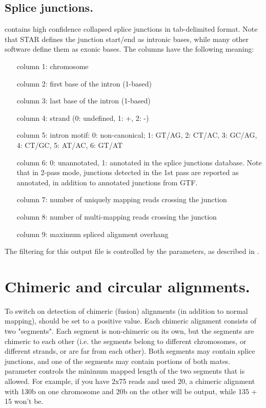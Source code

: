\documentclass[12pt]{article}
\begin{document}
\subsection{Splice junctions.}
 contains high confidence collapsed splice junctions in tab-delimited format. 
Note that STAR defines the junction start/end as intronic bases, while many other software define them as exonic bases.
The columns have the following meaning:
\begin{itemize}[leftmargin=1in]
\item[column 1:] chromosome
\item[column 2:] first base of the intron (1-based)
\item[column 3:] last base of the intron (1-based)
\item[column 4:] strand (0: undefined, 1: +, 2: -)
\item[column 5:] intron motif: 0: non-canonical; 1: GT/AG, 2: CT/AC, 3: GC/AG, 4: CT/GC, 5: AT/AC, 6: GT/AT
\item[column 6:] 0: unannotated, 1: annotated in the splice junctions database. Note that in 2-pass mode, junctions detected in the 1st pass are reported as annotated, in addition to annotated junctions from GTF.
\item[column 7:] number of uniquely mapping reads crossing the junction
\item[column 8:] number of multi-mapping reads crossing the junction
\item[column 9:] maximum spliced alignment overhang 
\end{itemize}
The filtering for this output file is controlled by the  parameters, as described in .

\section{Chimeric and circular alignments.}
To switch on detection of chimeric (fusion) alignments (in addition to normal mapping),  should be set to a positive value. Each chimeric alignment consists of two "segments". Each segment is non-chimeric on its own, but the segments are chimeric to each other (i.e. the segments belong to different chromosomes, or different strands, or are far from each other). Both segments may contain splice junctions, and one of the segments may contain portions of both mates.  parameter controls the minimum mapped length of the two segments that is allowed. For example, if you have 2x75 reads and used  20, a chimeric alignment with 130b on one chromosome and 20b on the other will be output, while 135 + 15 won't be.
\end{document}
